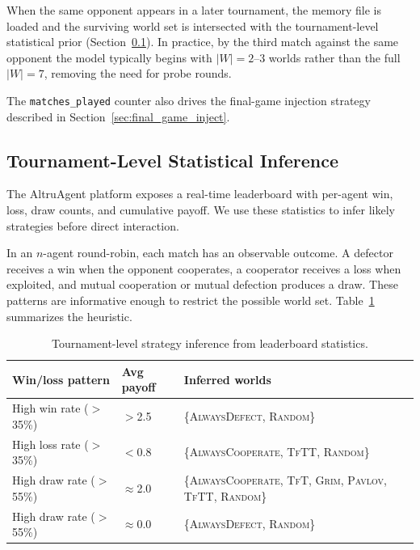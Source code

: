 \documentclass[11pt]{article}
\begin{document}
When the same opponent appears in a later tournament, the memory file is loaded and the
surviving world set is intersected with the tournament-level statistical prior
(Section~\ref{sec:tournament_inference}). In practice, by the third match against the same
opponent the model typically begins with $|W| = 2$--$3$ worlds rather than the full $|W| = 7$,
removing the need for probe rounds.

The \texttt{matches\_played} counter also drives the final-game injection strategy described
in Section~\ref{sec:final_game_inject}.

\subsection{Tournament-Level Statistical Inference}
\label{sec:tournament_inference}

The AltruAgent platform exposes a real-time leaderboard with per-agent win, loss, draw counts,
and cumulative payoff. We use these statistics to infer likely strategies before direct
interaction.

In an $n$-agent round-robin, each match has an observable outcome. A defector receives a win
when the opponent cooperates, a cooperator receives a loss when exploited, and mutual
cooperation or mutual defection produces a draw. These patterns are informative enough to
restrict the possible world set. Table~\ref{tab:inference} summarizes the heuristic.

\begin{table}[h]
\centering
\small
\begin{tabular}{@{}lll@{}}
\toprule
Win/loss pattern & Avg payoff & Inferred worlds \\
\midrule
High win rate ($>$35\%)  & $>$2.5      & \{\textsc{AlwaysDefect}, \textsc{Random}\} \\
High loss rate ($>$35\%) & $<$0.8      & \{\textsc{AlwaysCooperate}, \textsc{TfTT}, \textsc{Random}\} \\
High draw rate ($>$55\%) & $\approx$2.0 & \{\textsc{AlwaysCooperate}, \textsc{TfT}, \textsc{Grim}, \textsc{Pavlov}, \textsc{TfTT}, \textsc{Random}\} \\
High draw rate ($>$55\%) & $\approx$0.0 & \{\textsc{AlwaysDefect}, \textsc{Random}\} \\
\bottomrule
\end{tabular}
\caption{Tournament-level strategy inference from leaderboard statistics.}
\label{tab:inference}
\end{table}
\end{document}
